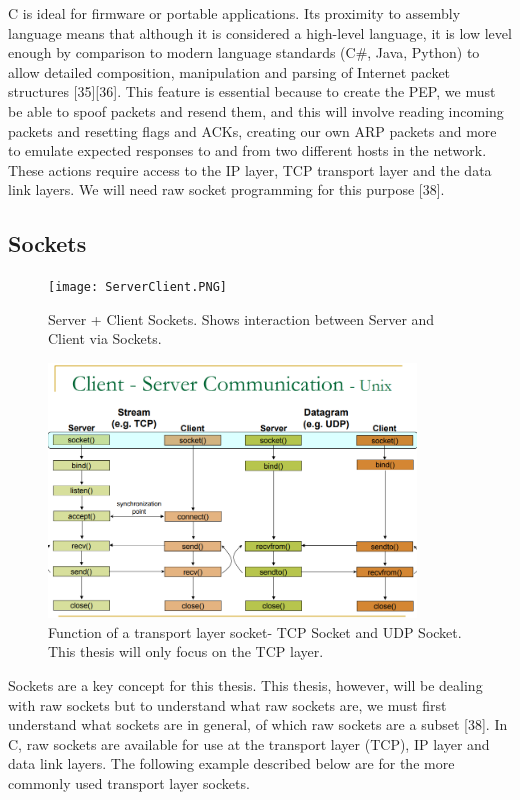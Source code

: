 \documentclass{uathesis}
\begin{document}
C is ideal for firmware or portable applications. Its proximity to assembly language means that although it is considered a high-level language,  it is low level enough by comparison to modern language standards (C\#, Java, Python) to allow detailed composition, manipulation and parsing of Internet packet structures [35][36]. This feature is essential because to create the PEP, we must be able to spoof packets and resend them, and this will involve reading incoming packets and resetting flags and ACKs, creating our own ARP packets and more to emulate expected responses to and from two different hosts in the network. These actions require access to the IP layer, TCP transport layer and the data link layers. We will need raw socket programming for this purpose [38]. 

\subsection{Sockets}
\begin{figure}[h!]
    \centering
    \texttt{[image: ServerClient.PNG]}
    \caption{Server + Client Sockets. Shows interaction between Server and Client via Sockets.}
    \label{fig:Server Client Model}
\end{figure}
\begin{figure}[h!]
    \centering
    \includegraphics[width=0.87\textwidth]{Socket.PNG}
    \caption{ Function of a transport layer socket- TCP Socket and UDP Socket. This thesis will only focus on the TCP layer. }
    \label{fig:Socket}
\end{figure}
Sockets are a key concept for this thesis. This thesis, however, will be dealing with raw sockets but to understand what raw sockets are, we must first understand what sockets are in general, of which raw sockets are a subset [38]. In C, raw sockets are available for use at the transport layer (TCP), IP layer and data link layers. The following example described below are for the more commonly used transport layer sockets. \\
\end{document}
